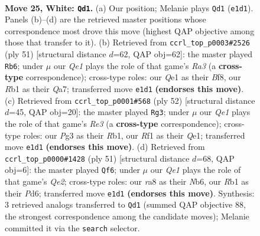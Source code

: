 \documentclass[11pt]{article}
\begin{document}
\clearpage

\begin{figure}[p]\centering
\begin{subfigure}{0.46\textwidth}\centering
\resizebox{\linewidth}{!}{%
\newchessgame
\chessboard[
  setfen={r1bq1rk1/8/8/2p1pp1p/7P/p1P3P1/P2B1P2/1R2QRK1 w - - 0 25},
  showmover=false,
  pgfstyle=straightmove, color=movearrow, markmove={e1-d1}
]}
\caption{}
\end{subfigure}\hfill
\begin{subfigure}{0.46\textwidth}\centering
\resizebox{\linewidth}{!}{%
\newchessgame
\chessboard[
  setfen={r4bk1/q4p2/r3p1p1/1R1p4/6PP/PBP5/1P1Q4/1K1R4 b - - 0 26},
  showmover=false,
  pgfstyle=straightmove, color=movearrow, markmove={a6-b6}
]}
\caption{}
\end{subfigure}
\\[4pt]
\begin{subfigure}{0.46\textwidth}\centering
\resizebox{\linewidth}{!}{%
\newchessgame
\chessboard[
  setfen={r4r2/p4q1k/b1pp3p/4p3/4P1pP/4R3/P2B1PP1/1R2Q1K1 w - - 0 27},
  showmover=false,
  pgfstyle=straightmove, color=movearrow, markmove={e3-g3}
]}
\caption{}
\end{subfigure}\hfill
\begin{subfigure}{0.46\textwidth}\centering
\resizebox{\linewidth}{!}{%
\newchessgame
\chessboard[
  setfen={5rk1/1r2q2p/1n1p3Q/2pP1p2/1p6/1P5P/R3BPP1/R5K1 b - - 1 26},
  showmover=false,
  pgfstyle=straightmove, color=movearrow, markmove={e7-f6}
]}
\caption{}
\end{subfigure}
\caption{\textbf{Move 25, White: \texttt{Qd1}.} (a) Our position; Melanie plays \texttt{Qd1} (\texttt{e1d1}). Panels (b)--(d) are the retrieved master positions whose correspondence most drove this move (highest QAP objective among those that transfer to it). (b) Retrieved from \texttt{ccrl\_top\_p0003\#2526} (ply 51) [structural distance $d$=62, QAP obj=62]: the master played \texttt{Rb6}; under $\mu$ our \emph{Qe1} plays the role of that game's \emph{Ra3} (a \textbf{cross-type} correspondence); cross-type roles: our \emph{Q}e1 as their \emph{B}f8, our \emph{R}b1 as their \emph{Q}a7; transferred move \texttt{e1d1} \textbf{(endorses this move)}. (c) Retrieved from \texttt{ccrl\_top\_p0001\#568} (ply 52) [structural distance $d$=45, QAP obj=20]: the master played \texttt{Rg3}; under $\mu$ our \emph{Qe1} plays the role of that game's \emph{Re3} (a \textbf{cross-type} correspondence); cross-type roles: our \emph{P}g3 as their \emph{R}b1, our \emph{R}f1 as their \emph{Q}e1; transferred move \texttt{e1d1} \textbf{(endorses this move)}. (d) Retrieved from \texttt{ccrl\_top\_p0000\#1428} (ply 51) [structural distance $d$=68, QAP obj=6]: the master played \texttt{Qf6}; under $\mu$ our \emph{Qe1} plays the role of that game's \emph{Qe2}; cross-type roles: our \emph{r}a8 as their \emph{N}b6, our \emph{R}b1 as their \emph{P}d6; transferred move \texttt{e1d1} \textbf{(endorses this move)}. Synthesis: 3 retrieved analogs transferred to \texttt{Qd1} (summed QAP objective 88, the strongest correspondence among the candidate moves); Melanie committed it via the \texttt{search} selector.}
\label{fig:thought-m48}
\end{figure}
\end{document}
